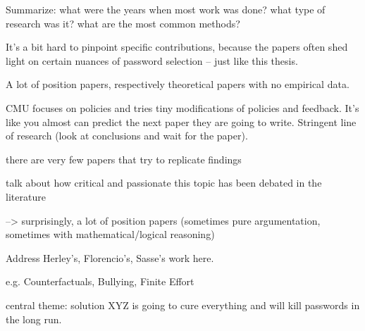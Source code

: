Summarize: what were the years when most work was done? what type of research was it? what are the most common methods?

It's a bit hard to pinpoint specific contributions, because the papers often shed light on certain nuances of password selection -- just like this thesis.

A lot of position papers, respectively theoretical papers with no empirical data.

CMU focuses on policies and tries tiny modifications of policies and feedback. It's like you almost can predict the next paper they are going to write. Stringent line of research (look at conclusions and wait for the paper).


there are very few papers that try to replicate findings



talk about how critical and passionate this topic has been debated in the literature

--> surprisingly, a lot of position papers (sometimes pure argumentation, sometimes with mathematical/logical reasoning) 

Address Herley's, Florencio's, Sasse's work here. 

e.g. Counterfactuals, Bullying, Finite Effort 


central theme: solution XYZ is going to cure everything and will kill passwords in the long run. 


